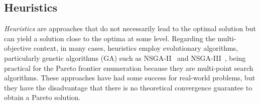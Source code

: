 \documentclass[../../main]{subfiles}
\begin{document}
\subsection{Heuristics}
\emph{Heuristics} are approaches that do not necessarily lead to the optimal solution but can yield a solution close to the optima at some level.
Regarding the multi-objective context, in many cases, heuristics employ evolutionary algorithms, particularly genetic algorithms (GA) such as NSGA-II~\cite{Deb2002} and NSGA-III~\cite{Deb2014}, being practical for the Pareto frontier enumeration because they are multi-point search algorithms.
These approaches have had some success for real-world problems, but they have the disadvantage that there is no theoretical convergence guarantee to obtain a Pareto solution.
\end{document}
